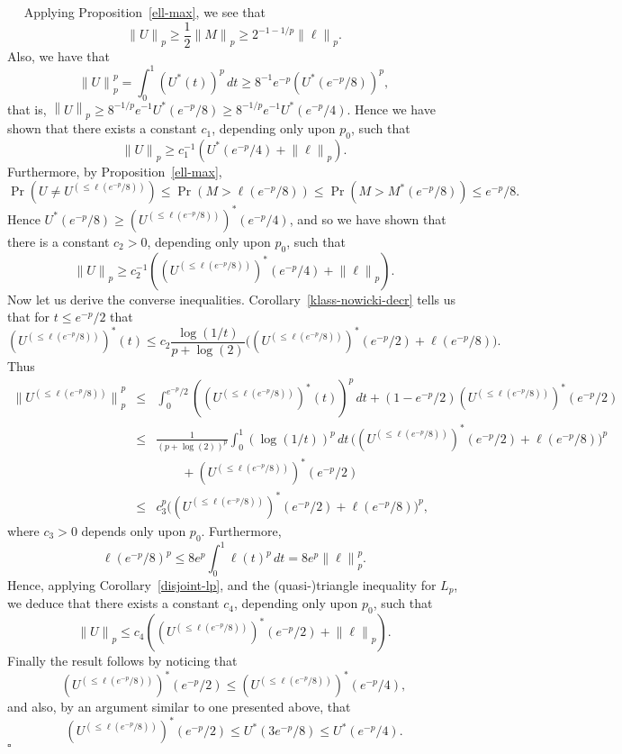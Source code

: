 \documentclass[12pt]{article}
\newcommand{\normo}[1]{{\left\|#1\right\|}}
\newcommand{\snormo}[1]{{\mathopen\|#1\mathclose\|}}
\newcommand{\Proofof}[1]{\medskip\noindent{\bf Proof of #1:}\ \ }
\newcommand{\qed}{\leavevmode\unskip\penalty9999
                  \hbox{}\nobreak\hfill$\square$\goodbreak\medskip}
\begin{document}
\Proofof{Theorem~\ref{lp}} Applying Proposition~\ref{ell-max}, we see that 
$$ \snormo U_p \ge {\frac{1}{ 2}} \snormo M_p \ge 2^{-1-1/p} \snormo\ell_p
.$$ Also, we have that $$ \snormo U_p^p = \int_0^1 (U^*(t))^p \, dt
\ge 8^{-1} e^{-p} (U^*(e^{-p}/8))^p ,$$ that is, $\normo U_p \ge
8^{-1/p} 
e^{-1} U^*(e^{-p}/8) \ge 8^{-1/p} e^{-1} U^*(e^{-p}/4)$. 
Hence we have shown that there exists a constant $c_1$, depending only
upon $p_0$, such that $$ \snormo U_p \ge c_1^{-1}(U^*(e^{-p}/4) +
\snormo 
\ell_p) .$$ Furthermore, by Proposition~\ref{ell-max}, $$ \Pr(U \ne U^{(\le 
\ell(e^{-p}/8))}) \le \Pr(M > \ell(e^{-p}/8))   \le \Pr(M >
M^*(e^{-p}/8)) \le e^{-p}/8 .$$ Hence $U^*(e^{-p}/8) \ge (U^{(\le
\ell(e^{-p}/8))})^*(e^{-p}/4)$, and so we have shown that there is a
constant $c_2>0$, depending only upon $p_0$, such that $$ \snormo U_p
\ge c_2^{-1}((U^{(\le \ell(e^{-p}/8))})^*                (e^{-p}/4) +
\snormo \ell_p) . $$ Now let us derive the converse inequalities. 
Corollary~\ref{klass-nowicki-decr} tells us that for $t \le e^{-p}/2$ that 
$$ (U^{(\le \ell(e^{-p}/8))})^*(t) \le c_2 {\frac{\log(1/t) }{ p +
\log(2)}}
\bigl((U^{(\le \ell(e^{-p}/8))})^*(e^{-p}/2) + \ell(e^{-p}/8)
\bigr). $$ 
Thus
\begin{eqnarray*}
  \snormo{U^{(\le \ell(e^{-p}/8))}}_p^p
  &\le& \int_0^{e^{-p}/2} ((U^{(\le \ell(e^{-p}/8))})^*(t))^p \, dt 
+(1-e^{-p}/2)(U^{(\le \ell(e^{-p}/8))})^*(e^{-p}/2)  \\ 
  &\le& {\frac{1}{ (p + \log(2))^p}} \int_0^1 (\log(1/t))^p \, dt
        \,\bigl((U^{(\le \ell(e^{-p}/8))})^*(e^{-p}/2) + 
        \ell(e^{-p}/8) \bigr)^p \\
& & \qquad + (U^{(\le \ell(e^{-p}/8))})^*(e^{-p}/2)\\
  &\le& c_3^p\bigl((U^{(\le \ell(e^{-p}/8))})^*(e^{-p}/2) +
       \ell(e^{-p}/8) \bigr)^p ,
\end{eqnarray*} 
where $c_3>0$ depends only upon $p_0$. Furthermore, 
$$ \ell(e^{-p}/8)^p \le 8 e^p \int_0^1 \ell(t)^p \, dt = 8 e^p
\snormo\ell_p^p.$$ Hence, applying Corollary~\ref{disjoint-lp}, and the
(quasi-)triangle 
inequality for $L_p$, we deduce that
 there exists a constant $c_4$, depending only upon $p_0$, such that 
$$ \snormo U_p \le c_4((U^{(\le \ell(e^{-p}/8))})^*  (e^{-p}/2)
 + \snormo \ell_p) . $$ Finally the result follows by noticing that 
$$ (U^{(\le \ell(e^{-p}/8))})^*(e^{-p}/2) \le   (U^{(\le
\ell(e^{-p}/8))})^*
(e^{-p}/4) ,$$ and also, by an argument similar to one presented
above, 
that $$ (U^{(\le \ell(e^{-p}/8))})^*(e^{-p}/2) \le U^*(3e^{-p}/8) \le
U^*(e^{-p}/4) .$$ \qed
\end{document}
